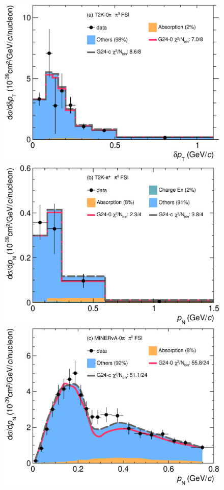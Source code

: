 \begin{figure}[!htb]
    \includegraphics[width=\dbfigwid\textwidth]{figures/tuning/0026-t2k_0pi_dpt_pi0_decomp_covfix.eps}
    \includegraphics[width=\dbfigwid\textwidth]{figures/tuning/0026-t2k_pip_pn_pi0_decomp_covfix.eps}	
    \includegraphics[width=\dbfigwid\textwidth]{figures/tuning/0026-min_0pi_pn_pi0_decomp_covfix.eps}

\end{figure}
